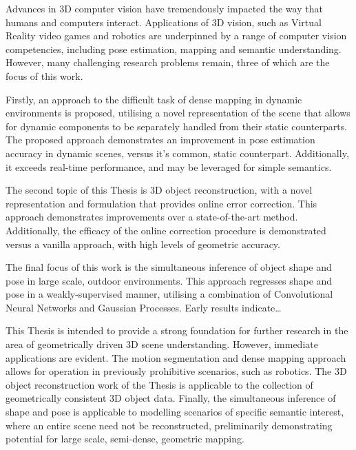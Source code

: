 Advances in 3D computer vision have tremendously impacted the way that humans and computers interact. 
Applications of 3D vision, such as Virtual Reality video games and robotics are underpinned by a range of 
computer vision competencies, including pose estimation, mapping and semantic understanding. However, 
many challenging research problems remain, three of which are the focus of this work.

Firstly, an approach to the difficult task of dense mapping in dynamic environments is proposed, utilising a 
novel representation of the scene that allows for dynamic components to be separately handled from their 
static counterparts. The proposed approach demonstrates an improvement in pose estimation accuracy in dynamic scenes, 
versus it's common, static counterpart. Additionally, it exceeds real-time performance, and may be leveraged for simple 
semantics.

The second topic of this Thesis is 3D object reconstruction, with a novel representation and formulation that provides 
online error correction. This approach demonstrates improvements over a state-of-the-art method. Additionally, the efficacy 
of the online correction procedure is demonstrated versus a vanilla approach, with high levels of geometric accuracy.

The final focus of this work is the simultaneous inference of object shape and pose in large scale, outdoor environments. 
This approach regresses shape and pose in a weakly-supervised manner, utilising a combination of Convolutional Neural Networks 
and Gaussian Processes. Early results indicate\dots

This Thesis is intended to provide a strong foundation for further research in the area of geometrically driven 3D scene 
understanding. However, immediate applications are evident. The motion segmentation and dense mapping approach allows for operation 
in previously prohibitive scenarios, such as robotics. The 3D object reconstruction work of the Thesis is applicable to the collection of 
geometrically consistent 3D object data. Finally, the simultaneous inference of shape and pose is applicable to modelling scenarios of 
specific semantic interest, where an entire scene need not be reconstructed, preliminarily demonstrating potential for large 
scale, semi-dense, geometric mapping.